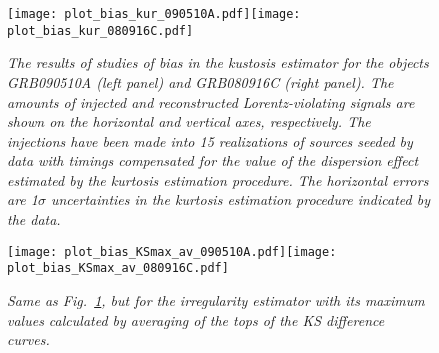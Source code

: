 \documentclass[12pt]{article}
\begin{document}
{%
\begin{figure}
\centering
\texttt{[image: plot\_bias\_kur\_090510A.pdf]}\hspace{0cm}\texttt{[image: plot\_bias\_kur\_080916C.pdf]}
\vspace{-0.4cm}
\caption{\it The results of studies of bias in the kustosis estimator for the objects GRB090510A (left panel) and  GRB080916C (right panel).
The amounts of injected and reconstructed Lorentz-violating signals are shown on the
horizontal and vertical axes, respectively. The injections have been made into 15 realizations of sources seeded by data with timings
compensated for the value of the dispersion effect estimated by the kurtosis estimation procedure.
The horizontal errors are 1$\sigma$ uncertainties in the kurtosis estimation procedure indicated by the data.}
\label{fig:BIAS_KURT}
\end{figure}

\begin{figure}
\centering
\texttt{[image: plot\_bias\_KSmax\_av\_090510A.pdf]}\hspace{0cm}\texttt{[image: plot\_bias\_KSmax\_av\_080916C.pdf]}
\vspace{-0.4cm}
\caption{\it Same as Fig.~\ref{fig:BIAS_KURT}, but for the irregularity estimator with its maximum values calculated
by averaging of the tops of the KS difference curves.}
\label{fig:BIAS_KSav}
\end{figure}

}
\end{document}
